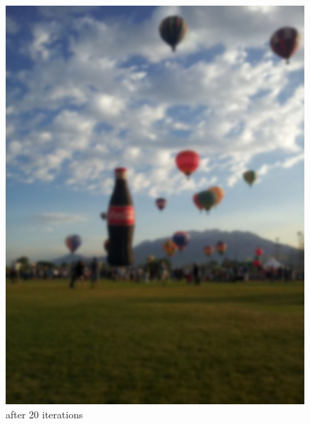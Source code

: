 \begin{figure}[ht]
\begin{minipage}[b]{0.45\linewidth}
\includegraphics[width=\textwidth]{baloon_resized_color_20.jpg}
\caption*{after 20 iterations}
\end{minipage}
\hspace{0.5cm}
\begin{minipage}[b]{0.45\linewidth}
\centering

\end{minipage}
\end{figure}
